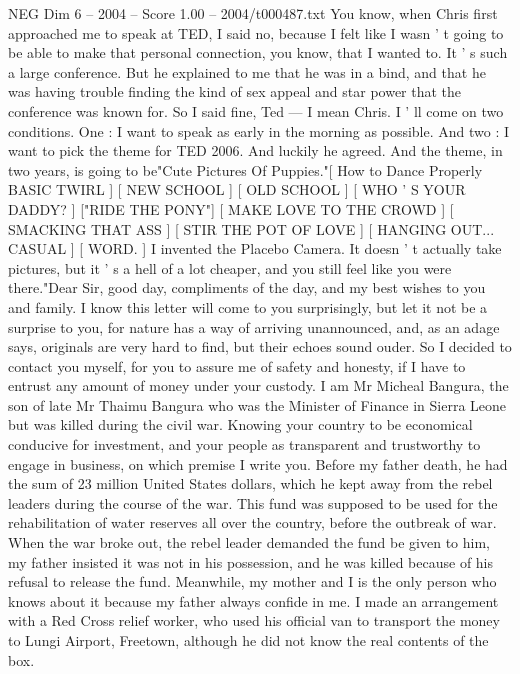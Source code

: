 \begin{textsample}{NEG Dim 6 – 2004 – Score 1.00 – 2004/t000487.txt}  \label{ex:f6_neg_051}
You know, when Chris first approached me to speak at TED, I said no, because I felt like I wasn ' t going to be able to make that personal connection, you know, that I wanted to.
It ' s such a large conference.
But he explained to me that he was in a bind, and that he was having trouble finding the kind of sex appeal and star power that the conference was known for.
So I said fine, Ted — I mean Chris.
I ' ll come on two conditions.
One : I want to speak as early in the morning as possible.
And two : I want to pick the theme for TED 2006.
And luckily he agreed.
And the theme, in two years, is going to be"Cute Pictures Of Puppies."[ How to Dance Properly BASIC TWIRL ] [ NEW SCHOOL ] [ OLD SCHOOL ] [ WHO ' S YOUR DADDY? ] ["RIDE THE PONY"] [ MAKE LOVE TO THE CROWD ] [ SMACKING THAT ASS ] [ STIR THE POT OF LOVE ] [ HANGING OUT...
CASUAL ] [ WORD. ] I invented the Placebo Camera.
It doesn ' t actually take pictures, but it ' s a hell of a lot cheaper, and you still feel like you were there."Dear Sir, good day, compliments of the day, and my best wishes to you and family.
I know this letter will come to you surprisingly, but let it not be a surprise to you, for nature has a way of arriving unannounced, and, as an adage says, originals are very hard to find, but their echoes sound ouder.
So I decided to contact you myself, for you to assure me of safety and honesty, if I have to entrust any amount of money under your custody.
I am Mr Micheal Bangura, the son of late Mr Thaimu Bangura who was the Minister of Finance in Sierra Leone but was killed during the civil war.
Knowing your country to be economical conducive for investment, and your people as transparent and trustworthy to engage in business, on which premise I write you.
Before my father death, he had the sum of 23 million United States dollars, which he kept away from the rebel leaders during the course of the war.
This fund was supposed to be used for the rehabilitation of water reserves all over the country, before the outbreak of war.
When the war broke out, the rebel leader demanded the fund be given to him, my father insisted it was not in his possession, and he was killed because of his refusal to release the fund.
Meanwhile, my mother and I is the only person who knows about it because my father always confide in me.
I made an arrangement with a Red Cross relief worker, who used his official van to transport the money to Lungi Airport, Freetown, although he did not know the real contents of the box.

\end{textsample}
